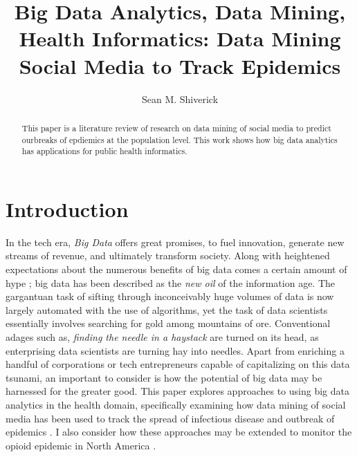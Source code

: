 \documentclass[sigconf]{acmart}
\begin{document}
\title{Big Data Analytics, Data Mining, Health Informatics: 
Data Mining Social Media to Track Epidemics}
\author{Sean M. Shiverick}


\begin{abstract}
This paper is a literature review of research on data mining of social media 
to predict ourbreaks of epdiemics at the population level. This work shows how 
big data analytics has applications for public health informatics.
\end{abstract}


\maketitle

\section{Introduction}

In the tech era, \textit{Big Data} offers great promises, to fuel innovation, 
generate new streams of revenue, and ultimately transform society. Along with 
heightened expectations about the numerous benefits of big data comes a certain 
amount of hype \cite{gupta15}; big data has been described as the \textit{new oil} 
of the information age. The gargantuan task of sifting through inconceivably huge
volumes of data is now largely automated with the use of algorithms, yet the task 
of data scientists essentially involves searching for gold among mountains of ore. 
Conventional adages such as, \textit{finding the needle in a haystack} are turned 
on its head, as enterprising data scientists are turning hay into needles. Apart 
from enriching a handful of corporations or tech entrepreneurs capable of 
capitalizing on this data tsunami, an important to consider is how the potential of 
big data may be harnessed for the greater good. This paper explores approaches to 
using big data analytics in the health domain, specifically examining how data 
mining of social media has been used to track the spread of infectious disease and 
outbreak of epidemics \cite{hay13}. I also consider how these approaches may be 
extended to monitor the opioid epidemic in North America \cite{volkow14}.
\end{document}
